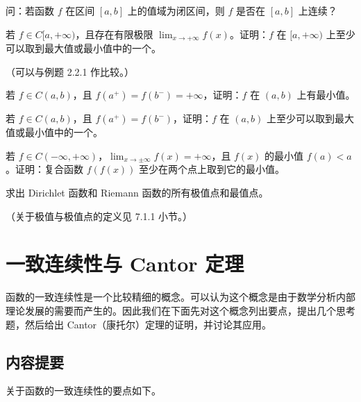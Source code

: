 \begin{xexercise}[4]
问：若函数 $f$ 在区间 $[a,b]$ 上的值域为闭区间，则 $f$ 是否在 $[a,b]$ 上连续？
\end{xexercise}

\begin{xexercise}[5]
若 $f\in C[a,+\infty)$，且存在有限极限 $\lim_{x\to+\infty}f(x)$。证明：$f$ 在 $[a,+\infty)$ 上至少可以取到最大值或最小值中的一个。

  （可以与例题 2.2.1 作比较。）
\end{xexercise}

\begin{xexercise}[6]
若 $f\in C(a,b)$，且 $f(a^+)=f(b^-)=+\infty$，证明：$f$ 在 $(a,b)$ 上有最小值。
\end{xexercise}

\begin{xexercise}[7]
若 $f\in C(a,b)$，且 $f(a^+)=f(b^-)$，证明：$f$ 在 $(a,b)$ 上至少可以取到最大值或最小值中的一个。
\end{xexercise}

\begin{xexercise}[8]
若 $f\in C(-\infty,+\infty)$，$\lim_{x\to\pm\infty}f(x)=+\infty$，且 $f(x)$ 的最小值 $f(a)<a$。证明：复合函数 $f(f(x))$ 至少在两个点上取到它的最小值。
\end{xexercise}

\begin{xexercise}[9]
求出 Dirichlet 函数和 Riemann 函数的所有极值点和最值点。

  （关于极值与极值点的定义见 7.1.1 小节。）
\end{xexercise}

\section{一致连续性与 Cantor 定理}

函数的一致连续性是一个比较精细的概念。可以认为这个概念是由于数学分析内部理论发展的需要而产生的。因此我们在下面先对这个概念列出要点，提出几个思考题，然后给出 Cantor（康托尔）定理的证明，并讨论其应用。

\subsection{内容提要}

关于函数的一致连续性的要点如下。

